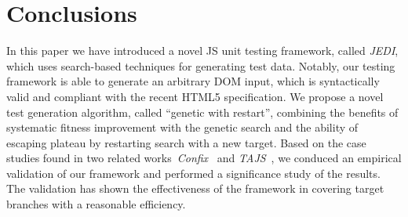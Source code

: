 \section{Conclusions}
\label{sec:concl}

In this paper we have introduced a novel JS unit testing framework, called \emph{JEDI}, which uses search-based techniques for generating test data. Notably, our testing framework is able to generate an arbitrary DOM input, which is syntactically valid and compliant with the recent HTML5 specification. We propose a novel test generation algorithm, called ``genetic with restart'', combining the benefits of systematic fitness improvement with the genetic search and the ability of escaping plateau by restarting search with a new target. Based on the case studies found in two related works~\emph{Confix}~\cite{amin:ase15} and \emph{TAJS}~\cite{dom2011}, we conduced an empirical validation of our framework and performed a significance study of the results. The validation has shown the effectiveness of the framework in covering target branches with a reasonable efficiency.
